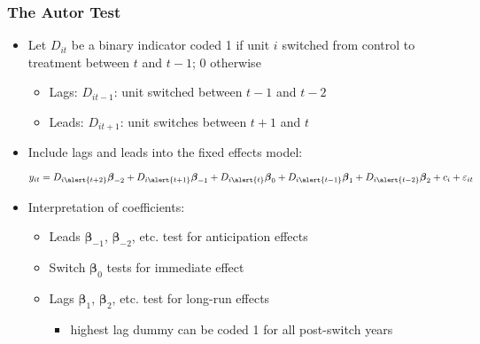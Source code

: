 \documentclass[xcolor=svgnames,9pt,english, aspectratio=169]{beamer}
\newcommand{\bs}{\boldsymbol}
\renewcommand{\b}{\ensuremath{\bs{\beta}}}
\begin{document}
\begin{frame}
  \frametitle{The Autor Test}
\begin{itemize}
\item Let $D_{it}$ be a binary indicator coded 1 if unit $i$ \alert{switched} from control to treatment between $t$ and $t-1$; 0 otherwise
    \begin{itemize}
      \item Lags: $D_{it-1}$: unit switched between $t-1$ and $t-2$
      \item Leads: $D_{it+1}$: unit switches between $t+1$ and $t$
    \end{itemize}\medskip\pause
\item Include lags and leads into the fixed effects model:
\[
y_{it} = D_{i\alert{t+2}}\b_{-2} + D_{i\alert{t+1}}\b_{-1}  + D_{i\alert{t}}\b_0 + D_{i\alert{t-1}}\b_1 + D_{i\alert{t-2}}\b_2+ c_i + \varepsilon_{it}
\]\vspace{-.2in}\medskip\pause
\item Interpretation of coefficients:
    \begin{itemize}
    \item Leads $\b_{-1}$, $\b_{-2}$, etc. test for anticipation effects
    \item Switch $\b_{0}$ tests for immediate effect
    \item Lags $\b_{1}$, $\b_{2}$, etc. test for long-run effects
    \begin{itemize}
      \item  highest lag dummy can be coded 1 for all post-switch years
    \end{itemize}
\end{itemize}
\end{itemize}
\end{frame}




\end{document}
